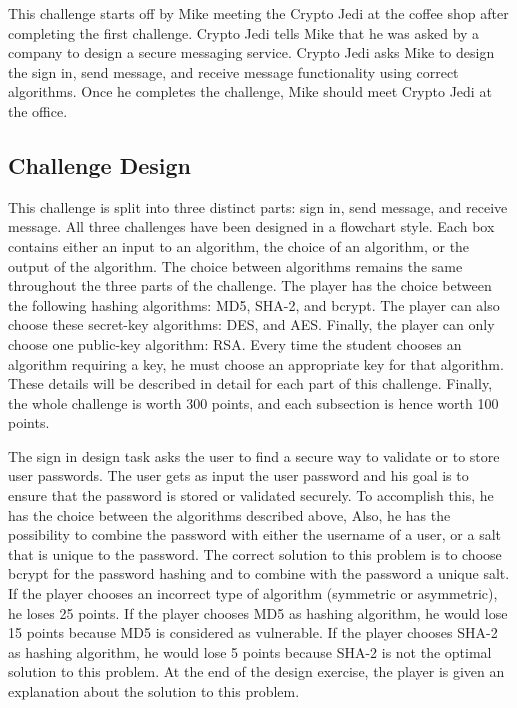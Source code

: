 \documentclass{l4proj}
\begin{document}
This challenge starts off by Mike meeting the Crypto Jedi at the coffee shop after completing the first challenge.
Crypto Jedi tells Mike that he was asked by a company to design a secure messaging service. 
Crypto Jedi asks Mike to design the sign in, send message, and receive message functionality
using correct algorithms. Once he completes the challenge, Mike should meet Crypto Jedi at the office.

\subsection{Challenge Design}

This challenge is split into three distinct parts: sign in, send message, and receive message.
All three challenges have been designed in a flowchart style. 
Each box contains either an input to an algorithm, the choice of an algorithm, 
or the output of the algorithm. 
The choice between algorithms remains the same throughout the three parts of the challenge.
The player has the choice between the following hashing algorithms: MD5, SHA-2, and bcrypt.
The player can also choose these secret-key algorithms: DES, and AES.
Finally, the player can only choose one public-key algorithm: RSA.
Every time the student chooses an algorithm requiring a key, 
he must choose an appropriate key for that algorithm. 
These details will be described in detail for each part of this challenge.
Finally, the whole challenge is worth 300 points, and each subsection is hence worth 100 points.

The sign in design task asks the user to find a secure way to validate or to store user passwords.
The user gets as input the user password 
and his goal is to ensure that the password is stored or validated securely.
To accomplish this, he has the choice between the algorithms described above, 
Also, he has the possibility to combine the password with either the username of a user,
or a salt that is unique to the password.
The correct solution to this problem is to choose bcrypt for the password hashing and
to combine with the password a unique salt.
If the player chooses an incorrect type of algorithm (symmetric or asymmetric), he loses 25 points.
If the player chooses MD5 as hashing algorithm, he would lose 15 points because MD5 is considered
as vulnerable. If the player chooses SHA-2 as hashing algorithm, he would lose 5 points because 
SHA-2 is not the optimal solution to this problem. 
At the end of the design exercise, the player is given an explanation about the solution to this problem.
\end{document}
